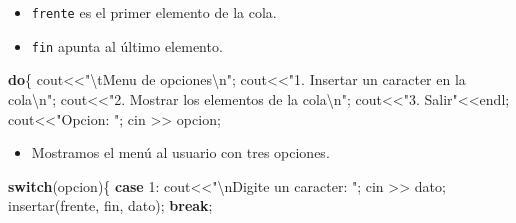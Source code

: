 \documentclass[
  11pt,
  a4paper,
  DIV=11,
  numbers=noendperiod]{scrreprt}
\newenvironment{Shaded}{\begin{snugshade}}{\end{snugshade}}
\newcommand{\ControlFlowTok}[1]{\textcolor[rgb]{0.00,0.23,0.31}{\textbf{#1}}}
\newcommand{\DecValTok}[1]{\textcolor[rgb]{0.68,0.00,0.00}{#1}}
\newcommand{\NormalTok}[1]{\textcolor[rgb]{0.00,0.23,0.31}{#1}}
\newcommand{\OperatorTok}[1]{\textcolor[rgb]{0.37,0.37,0.37}{#1}}
\newcommand{\SpecialCharTok}[1]{\textcolor[rgb]{0.37,0.37,0.37}{#1}}
\newcommand{\StringTok}[1]{\textcolor[rgb]{0.13,0.47,0.30}{#1}}
\providecommand{\tightlist}{%
  \setlength{\itemsep}{0pt}\setlength{\parskip}{0pt}}
\begin{document}
\begin{itemize}
\tightlist
\item
  \texttt{frente} es el primer elemento de la cola.
\item
  \texttt{fin} apunta al último elemento.
\end{itemize}

\begin{Shaded}
\begin{Highlighting}[]
    \ControlFlowTok{do}\OperatorTok{\{}
\NormalTok{        cout}\OperatorTok{\textless{}\textless{}}\StringTok{"}\SpecialCharTok{\textbackslash{}t}\StringTok{Menu de opciones}\SpecialCharTok{\textbackslash{}n}\StringTok{"}\OperatorTok{;}
\NormalTok{        cout}\OperatorTok{\textless{}\textless{}}\StringTok{"1. Insertar un caracter en la cola}\SpecialCharTok{\textbackslash{}n}\StringTok{"}\OperatorTok{;}
\NormalTok{        cout}\OperatorTok{\textless{}\textless{}}\StringTok{"2. Mostrar los elementos de la cola}\SpecialCharTok{\textbackslash{}n}\StringTok{"}\OperatorTok{;}
\NormalTok{        cout}\OperatorTok{\textless{}\textless{}}\StringTok{"3. Salir"}\OperatorTok{\textless{}\textless{}}\NormalTok{endl}\OperatorTok{;}
\NormalTok{        cout}\OperatorTok{\textless{}\textless{}}\StringTok{"Opcion: "}\OperatorTok{;}
\NormalTok{        cin }\OperatorTok{\textgreater{}\textgreater{}}\NormalTok{ opcion}\OperatorTok{;}
\end{Highlighting}
\end{Shaded}

\begin{itemize}
\tightlist
\item
  Mostramos el menú al usuario con tres opciones.
\end{itemize}

\begin{Shaded}
\begin{Highlighting}[]
        \ControlFlowTok{switch}\OperatorTok{(}\NormalTok{opcion}\OperatorTok{)\{}
            \ControlFlowTok{case} \DecValTok{1}\OperatorTok{:}\NormalTok{ cout}\OperatorTok{\textless{}\textless{}}\StringTok{"}\SpecialCharTok{\textbackslash{}n}\StringTok{Digite un caracter: "}\OperatorTok{;}
\NormalTok{                    cin }\OperatorTok{\textgreater{}\textgreater{}}\NormalTok{ dato}\OperatorTok{;}
\NormalTok{                    insertar}\OperatorTok{(}\NormalTok{frente}\OperatorTok{,}\NormalTok{ fin}\OperatorTok{,}\NormalTok{ dato}\OperatorTok{);}
                    \ControlFlowTok{break}\OperatorTok{;}
\end{Highlighting}
\end{Shaded}
\end{document}
